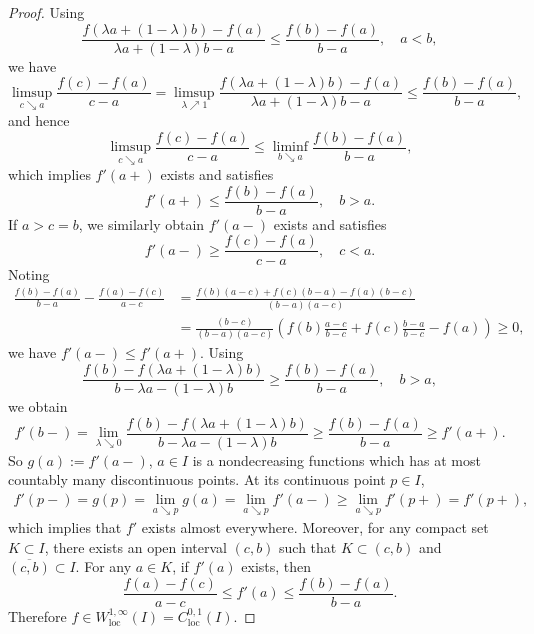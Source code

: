 \begin{proof}
	Using 
	\[
	\frac{f(\lambda a + (1-\lambda)b) - f(a)}{\lambda a + (1-\lambda)b - a} \leq \frac{f(b) - f(a)}{b-a},\quad a < b,
	\]
	we have
	\[
	\limsup_{c\searrow a}\frac{f(c)-f(a)}{c-a} 
	= \limsup_{\lambda\nearrow 1}\frac{f(\lambda a + (1-\lambda)b) - f(a)}{\lambda a + (1-\lambda)b - a} 
	\leq \frac{f(b) - f(a)}{b-a},
	\]
	and hence 
	\[
	\limsup_{c\searrow a}\frac{f(c)-f(a)}{c-a} 
	\leq \liminf_{b\searrow a}\frac{f(b)-f(a)}{b-a},
	\]
	which implies $f'(a+)$ exists and satisfies 
	\[
	f'(a+)\leq \frac{f(b) - f(a)}{b-a},\quad b>a.
	\]
	If $a>c=b$, we similarly obtain $f'(a-)$ exists and satisfies 
	\[
	f'(a-)\geq \frac{f(c) - f(a)}{c-a},\quad c<a.
	\]
	Noting 
	\begin{align*}
	\frac{f(b) - f(a)}{b-a} - \frac{f(a) - f(c)}{a-c}
	&= \frac{f(b)(a-c) + f(c)(b-a) - f(a)(b-c)}{(b-a)(a-c)}\\
	&= \frac{(b-c)}{(b-a)(a-c)}\left(f(b)\frac{a-c}{b-c} + f(c)\frac{b-a}{b-c} - f(a) \right)\geq 0,
	\end{align*}
	we have $f'(a-)\leq f'(a+)$.
	Using 
	\[
	\frac{f(b) - f(\lambda a + (1-\lambda)b)}{b - \lambda a - (1-\lambda)b} \geq \frac{f(b) - f(a)}{b-a},\quad b>a,
	\]
	we obtain
	\[
	f'(b-) = \lim_{\lambda\searrow0}\frac{f(b) - f(\lambda a + (1-\lambda)b)}{b - \lambda a - (1-\lambda)b}\geq \frac{f(b) - f(a)}{b-a}\geq f'(a+).
	\]
	So $g(a) := f'(a-)$, $a\in I$ is a nondecreasing functions 
	which has at most countably many  discontinuous points.
	At its continuous point $p\in I$,
	\begin{align*}
		f'(p-) = g(p) = \lim_{a\searrow p}g(a) 
		= \lim_{a\searrow p} f'(a-) \geq \lim_{a\searrow p}f'(p+) = f'(p+),
	\end{align*} 
	which implies that $f'$ exists almost everywhere.
	Moreover, for any compact set $K\subset I$, 
	there exists an open interval $(c,b)$ such that $K\subset(c,b)$ and $\overline{(c,b)}\subset I$. 
	For any $a\in K$, if $f'(a)$ exists, 
	then  
	\[
	\frac{f(a) - f(c)}{a - c} 
	\leq f'(a) \leq \frac{f(b) - f(a)}{b - a}.
	\] 
	Therefore $f\in W^{1,\infty}_{\mathrm{loc}}(I) = C^{0,1}_{\mathrm{loc}}(I)$.
\end{proof}

